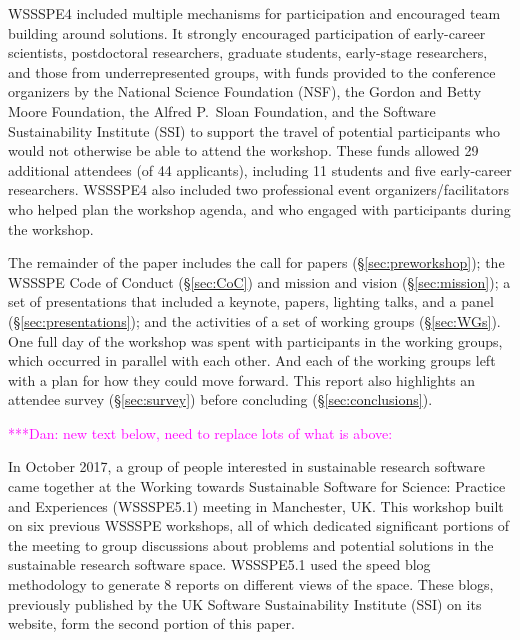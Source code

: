 \documentclass[11pt, oneside]{amsart}
\newcommand{\todo}[1]{{\color{blue}$\blacksquare$~\textsf{[TODO: #1]}}}
\newcommand{\katznote}[1]{ {\textcolor{magenta}    { ***Dan:      #1 }}}
\begin{document}
WSSSPE4 included multiple mechanisms for participation and
encouraged team building around solutions. It strongly encouraged participation
of early-career scientists, postdoctoral researchers, graduate students,
early-stage researchers, and those from underrepresented groups,
with funds provided to the conference organizers by the National Science
Foundation (NSF), the Gordon and Betty Moore Foundation, the Alfred P.~Sloan Foundation, and the Software
Sustainability Institute (SSI) to support the travel of potential participants
who would not otherwise be able to attend the workshop. These
funds allowed 29 additional attendees %
(of 44 applicants), 
including 11 students and five early-career
researchers.
%
WSSSPE4 also included two professional event organizers/facilitators who helped
plan the workshop agenda,
and who engaged with participants during the workshop.

The remainder of the paper includes the call for papers (\S\ref{sec:preworkshop}); the WSSSPE Code of Conduct (\S\ref{sec:CoC}) and mission and vision (\S\ref{sec:mission}); a set of presentations that included a keynote, papers, lighting talks, and a panel (\S\ref{sec:presentations}); and the activities of a set of working groups (\S\ref{sec:WGs}).  One full day of the
workshop was spent with participants in the working groups, which occurred in parallel
with each other.  And each of the working groups left with a plan for how they could move
forward.
This report also highlights an attendee survey (\S\ref{sec:survey}) before concluding (\S\ref{sec:conclusions}).

\katznote{new text below, need to replace lots of what is above:}

In October 2017, a group of people interested in sustainable research software came together at the Working towards Sustainable Software for Science: Practice and Experiences (WSSSPE5.1) meeting in Manchester, UK. This workshop built on six previous WSSSPE workshops, all of which dedicated significant portions of the meeting to group discussions about problems and potential solutions in the sustainable research software space.  WSSSPE5.1 used the speed blog methodology to generate 8 reports on different views of the space. These blogs, previously published by the UK Software Sustainability Institute (SSI) on its website, form the second portion of this paper.
\end{document}
